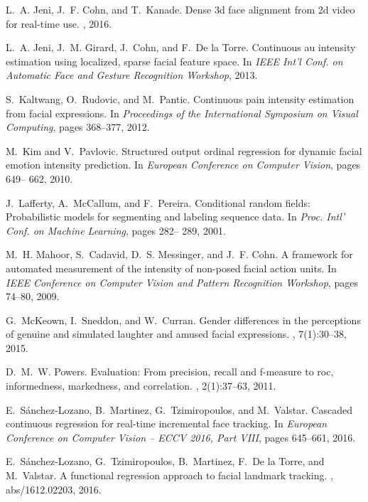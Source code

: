 \documentclass[a4paper, 10pt, conference]{ieeeconf}      \usepackage{FG2017}
\begin{document}
\begin{thebibliography}{10}
L.~A. Jeni, J.~F. Cohn, and T.~Kanade.
\newblock Dense 3d face alignment from 2d video for real-time use.
, 2016.

L.~A. Jeni, J.~M. Girard, J.~Cohn, and F.~{De la Torre}.
\newblock Continuous au intensity estimation using localized, sparse facial
  feature space.
\newblock In {\em IEEE Int'l Conf. on Automatic Face and Gesture Recognition
  Workshop}, 2013.

S.~Kaltwang, O.~Rudovic, and M.~Pantic.
\newblock Continuous pain intensity estimation from facial expressions.
\newblock In {\em Proceedings of the International Symposium on Visual
  Computing}, pages 368--377, 2012.

M.~Kim and V.~Pavlovic.
\newblock Structured output ordinal regression for dynamic facial emotion
  intensity prediction.
\newblock In {\em European Conference on Computer Vision}, pages 649-- 662,
  2010.

J.~Lafferty, A.~McCallum, and F.~Pereira.
\newblock Conditional random fields: Probabilistic models for segmenting and
  labeling sequence data.
\newblock In {\em Proc. Intl' Conf. on Machine Learning}, pages 282-- 289,
  2001.

M.~H. Mahoor, S.~Cadavid, D.~S. Messinger, and J.~F. Cohn.
\newblock A framework for automated measurement of the intensity of non-posed
  facial action units.
\newblock In {\em IEEE Conference on Computer Vision and Pattern Recognition
  Workshop}, pages 74--80, 2009.

G.~McKeown, I.~Sneddon, and W.~Curran.
\newblock Gender differences in the perceptions of genuine and simulated
  laughter and amused facial expressions.
, 7(1):30--38, 2015.

D.~M.~W. Powers.
\newblock Evaluation: From precision, recall and f-measure to roc,
  informedness, markedness, and correlation.
, 2(1):37--63, 2011.

E.~S{\'a}nchez-Lozano, B.~Martinez, G.~Tzimiropoulos, and M.~Valstar.
\newblock Cascaded continuous regression for real-time incremental face
  tracking.
\newblock In {\em European Conference on Computer Vision -- ECCV 2016, Part
  VIII}, pages 645--661, 2016.

E.~S\'anchez-Lozano, G.~Tzimiropoulos, B.~Martinez, F.~{De la Torre}, and
  M.~Valstar.
\newblock A functional regression approach to facial landmark tracking.
, abs/1612.02203, 2016.


\end{thebibliography}
\end{document}
